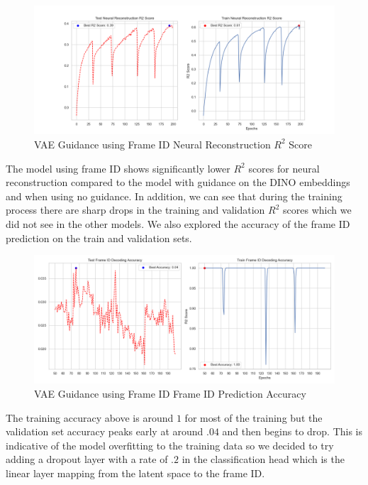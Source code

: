 \documentclass[12pt, letterpaper]{article}
\begin{document}
\begin{figure}[H]
    \centering
    \includegraphics[width=1.0\textwidth]{x_r2_128dim_503_top_var_200_epochs_0.05_beta_2_layer_frame_id_guidance.png}
    \caption{VAE Guidance using Frame ID Neural Reconstruction $R^2$ Score}
    \label{fig:vae_guidance_frame_id}
\end{figure}

The model using frame ID shows significantly lower $R^2$ scores for neural reconstruction compared to the model with guidance on the DINO \cite{dino} embeddings and when using no guidance. In addition, we can see that during the training process there are sharp drops in the training and validation $R^2$ scores which we did not see in the other models. We also explored the accuracy of the frame ID prediction on the train and validation sets.

\begin{figure}[H]
    \centering
    \includegraphics[width=1.0\textwidth]{frame_id_accuracy_128dim_503_top_var_200_epochs_0.05_beta_2_layer.png}
    \caption{VAE Guidance using Frame ID Frame ID Prediction Accuracy}
    \label{fig:vae_guidance_frame_id_accuracy}
\end{figure}

The training accuracy above is around $1$ for most of the training but the validation set accuracy peaks early at around $.04$ and then begins to drop. This is indicative of the model overfitting to the training data so we decided to try adding a dropout layer with a rate of $.2$ in the classification head which is the linear layer mapping from the latent space to the frame ID. 
\end{document}
